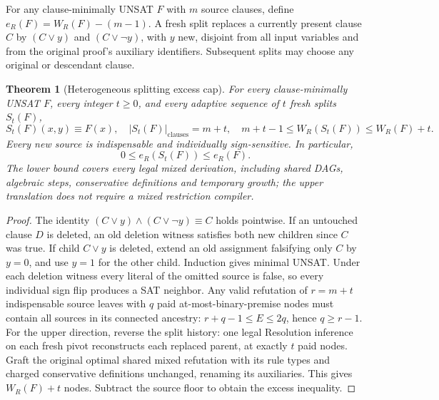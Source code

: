 \documentclass[11pt]{article}
\newtheorem{theorem}{Theorem}
\begin{document}
For any clause-minimally UNSAT $F$ with $m$ source clauses, define $e_R(F)=W_R(F)-(m-1)$. A fresh split replaces a currently present clause $C$ by $(C\vee y)$ and $(C\vee\neg y)$, with $y$ new, disjoint from all input variables and from the original proof's auxiliary identifiers. Subsequent splits may choose any original or descendant clause.
\begin{theorem}[Heterogeneous splitting excess cap]
For every clause-minimally UNSAT $F$, every integer $t\ge0$, and every adaptive sequence of $t$ fresh splits $S_t(F)$,
\[
\boxed{S_t(F)(x,y)\equiv F(x),\quad |S_t(F)|_{\mathrm{clauses}}=m+t,\quad
m+t-1\le W_R(S_t(F))\le W_R(F)+t.}
\]
Every new source is indispensable and individually sign-sensitive. In particular,
\[
\boxed{0\le e_R(S_t(F))\le e_R(F).}
\]
The lower bound covers every legal mixed derivation, including shared DAGs, algebraic steps, conservative definitions and temporary growth; the upper translation does not require a mixed restriction compiler.
\end{theorem}
\begin{proof}
The identity $(C\vee y)\wedge(C\vee\neg y)\equiv C$ holds pointwise. If an untouched clause $D$ is deleted, an old deletion witness satisfies both new children since $C$ was true. If child $C\vee y$ is deleted, extend an old assignment falsifying only $C$ by $y=0$, and use $y=1$ for the other child. Induction gives minimal UNSAT. Under each deletion witness every literal of the omitted source is false, so every individual sign flip produces a SAT neighbor. Any valid refutation of $r=m+t$ indispensable source leaves with $q$ paid at-most-binary-premise nodes must contain all sources in its connected ancestry: $r+q-1\le E\le 2q$, hence $q\ge r-1$. For the upper direction, reverse the split history: one legal Resolution inference on each fresh pivot reconstructs each replaced parent, at exactly $t$ paid nodes. Graft the original optimal shared mixed refutation with its rule types and charged conservative definitions unchanged, renaming its auxiliaries. This gives $W_R(F)+t$ nodes. Subtract the source floor to obtain the excess inequality.
\end{proof}
\end{document}
